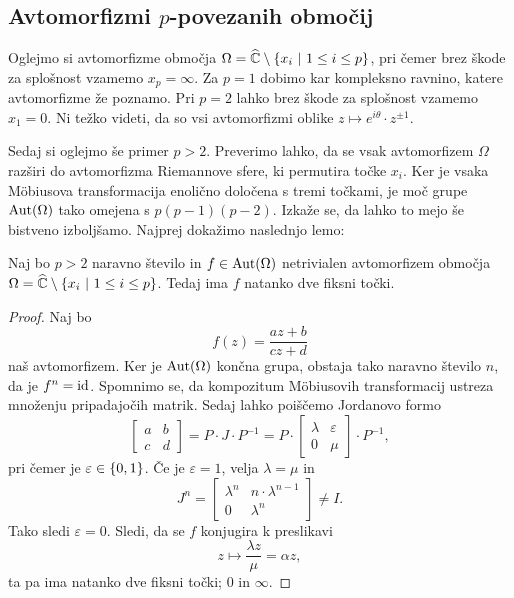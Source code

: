 

\subsection{Avtomorfizmi \texorpdfstring{$p$}{p}-povezanih območij}

Oglejmo si avtomorfizme območja
$\Omega = \widehat{\mathbb{C}} \setminus \left\{x_i~\middle\vert~1 \leq i \leq p\right\}$, pri čemer
brez škode za splošnost vzamemo $x_p = \infty$. Za $p = 1$ dobimo
kar kompleksno ravnino, katere avtomorfizme že poznamo. Pri $p = 2$
lahko brez škode za splošnost vzamemo $x_1 = 0$. Ni težko videti,
da so vsi avtomorfizmi oblike
$z \mapsto e^{i \theta} \cdot z^{\pm 1}$.

Sedaj si oglejmo še primer $p > 2$. Preverimo lahko, da se vsak
avtomorfizem $\Omega$ razširi do avtomorfizma Riemannove sfere, ki
permutira točke $x_i$. Ker je vsaka Möbiusova transformacija
enolično določena s tremi točkami, je moč grupe $\operatorname{Aut}(\Omega)$ tako
omejena s $p (p-1) (p-2)$. Izkaže se, da lahko to mejo še bistveno
izboljšamo. Najprej dokažimo naslednjo lemo:

\begin{lema}
Naj bo $p > 2$ naravno število in $f \in \operatorname{Aut}(\Omega)$ netrivialen
avtomorfizem območja
$\Omega = \widehat{\mathbb{C}} \setminus \left\{x_i~\middle\vert~1 \leq i \leq p\right\}$. Tedaj ima $f$
natanko dve fiksni točki.
\end{lema}

\begin{proof}
Naj bo
\[
f(z) = \frac{az + b}{cz + d}
\]
naš avtomorfizem. Ker je $\operatorname{Aut}(\Omega)$ končna grupa, obstaja tako
naravno število $n$, da je $f^n = \operatorname{id}$. Spomnimo se, da kompozitum
Möbiusovih transformacij ustreza množenju pripadajočih matrik.
Sedaj lahko poiščemo Jordanovo formo
\[
\begin{bmatrix}
a & b \\
c & d
\end{bmatrix}
=
P \cdot J \cdot P^{-1}
=
P \cdot
\begin{bmatrix}
\lambda & \varepsilon \\
   0    & \mu
\end{bmatrix}
\cdot P^{-1},
\]
pri čemer je $\varepsilon \in \left\{0, 1\right\}$. Če je $\varepsilon = 1$,
velja $\lambda = \mu$ in
\[
J^n =
\begin{bmatrix}
\lambda^n & n \cdot \lambda^{n-1} \\
    0     & \lambda^n
\end{bmatrix}
\ne I.
\]
Tako sledi $\varepsilon = 0$. Sledi, da se $f$ konjugira k
preslikavi
\[
z \mapsto \frac{\lambda z}{\mu} = \alpha z,
\]
ta pa ima natanko dve fiksni točki; $0$ in $\infty$.
\end{proof}

